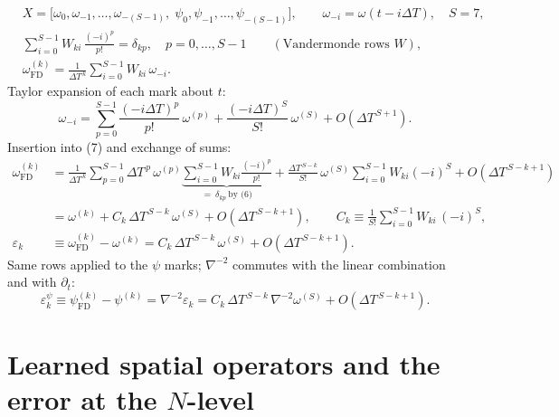 \documentclass[11pt]{article}
\newcommand{\DT}{\Delta T}
\begin{document}
\begin{align}
&X=\bigl[\omega_0,\omega_{-1},\dots,\omega_{-(S-1)},\;
\psi_0,\psi_{-1},\dots,\psi_{-(S-1)}\bigr],\qquad
\omega_{-i}=\omega(t-i\DT),\quad S=7,\\
&\sum_{i=0}^{S-1}W_{k i}\,\frac{(-i)^{p}}{p!}=\delta_{kp},
\quad p=0,\dots,S-1
\qquad(\text{Vandermonde rows }W),\\
&\omega^{(k)}_{\mathrm{FD}}=\frac{1}{\DT^{\,k}}\sum_{i=0}^{S-1}
W_{k i}\,\omega_{-i}.
\end{align}
Taylor expansion of each mark about $t$:
\begin{equation}
\omega_{-i}=\sum_{p=0}^{S-1}\frac{(-i\DT)^{p}}{p!}\,\omega^{(p)}
+\frac{(-i\DT)^{S}}{S!}\,\omega^{(S)}+O(\DT^{\,S+1}).
\end{equation}
Insertion into (7) and exchange of sums:
\begin{align}
\omega^{(k)}_{\mathrm{FD}}
&=\frac{1}{\DT^{\,k}}\sum_{p=0}^{S-1}\DT^{\,p}\,\omega^{(p)}
\underbrace{\sum_{i=0}^{S-1}W_{k i}\frac{(-i)^{p}}{p!}}_{=\ \delta_{kp}
\ \text{by (6)}}
+\frac{\DT^{\,S-k}}{S!}\,\omega^{(S)}\sum_{i=0}^{S-1}W_{k i}(-i)^{S}
+O(\DT^{\,S-k+1})\\
&=\omega^{(k)}
+C_k\,\DT^{\,S-k}\,\omega^{(S)}+O(\DT^{\,S-k+1}),
\qquad
C_k \equiv \frac{1}{S!}\sum_{i=0}^{S-1}W_{k i}\,(-i)^{S},\\
\varepsilon_k
&\equiv\omega^{(k)}_{\mathrm{FD}}-\omega^{(k)}
= C_k\,\DT^{\,S-k}\,\omega^{(S)}+O(\DT^{\,S-k+1}).
\end{align}
Same rows applied to the $\psi$ marks; $\nabla^{-2}$ commutes with the linear
combination and with $\partial_t$:
\begin{equation}
\varepsilon^{\psi}_{k}
\equiv\psi^{(k)}_{\mathrm{FD}}-\psi^{(k)}
=\nabla^{-2}\varepsilon_k
= C_k\,\DT^{\,S-k}\,\nabla^{-2}\omega^{(S)}+O(\DT^{\,S-k+1}).
\end{equation}

\section{Learned spatial operators and the error at the $N$-level}
\end{document}
